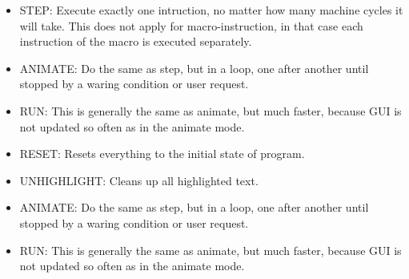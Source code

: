         \begin{itemize}
            \item STEP: Execute exactly one intruction, no matter how many machine cycles it will take. This does not apply for macro-instruction, in that case each instruction of the macro is executed separately.
            \item ANIMATE: Do the same as step, but in a loop, one after another until stopped by a waring condition or user request.
            \item RUN: This is generally the same as animate, but much faster, because GUI is not updated so often as in the animate mode.
            \item RESET: Resets everything to the initial state of program.
            \item UNHIGHLIGHT: Cleans up all highlighted text.

            \item ANIMATE: Do the same as step, but in a loop, one after another until stopped by a waring condition or user request.
            \item RUN: This is generally the same as animate, but much faster, because GUI is not updated so often as in the animate mode.
        \end{itemize}
